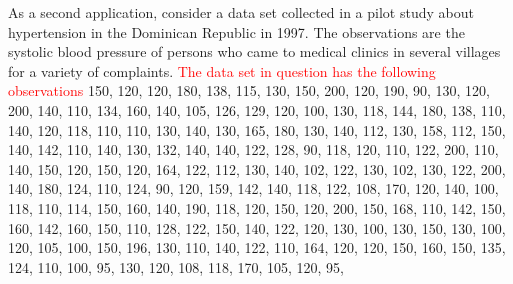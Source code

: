\documentclass[twoside,leqno,11pt]{article}
\begin{document}
As a second application, consider a data set collected in a pilot study about hypertension in the Dominican Republic
in 1997. The observations are the systolic blood pressure of persons who came to medical clinics in
several villages for a variety of complaints. 
\textcolor{red}{ The data set in question has the following observations} 
         150,
         120,
         120,
         180,
         138,
         115,
         130,
         150,
         200,
         120,
         190,
         90,
         130,
         120,
         200,
         140,
         110,
         134,
         160,
         140,
         105,
         126,
         129,
         120,
         100,
         130,
         118,
         144,
         180,
         138,
         110,
         140,
         120,
         118,
         110,
         110,
         130,
         140,
         130,
         165,
         180,
         130,
         140,
         112,
         130,
         158,
         112,
         150,
         140,
         142,
         110,
         140,
         130,
         132,
         140,
         140,
         122,
         128,
         90,
         118,
         120,
         110,
         122,
         200,
         110,
         140,
         150,
         120,
         150,
         120,
         164,
         122,
         112,
         130,
         140,
         102,
         122,
         130,
         102,
         130,
         122,
         200,
         140,
         180,
         124,
         110,
         124,
         90,
         120,
         159,
         142,
         140,
         118,
         122,
         108,
         170,
         120,
         140,
         100,
         118,
         110,
         114,
         150,
         160,
         140,
         190,
         118,
         120,
         150,
         120,
         200,
         150,
         168,
         110,
         142,
         150,
         160,
         142,
         160,
         150,
         110,
         128,
         122,
         150,
         140,
         122,
         120,
         130,
         100,
         130,
         150,
         130,
         100,
         120,
         105,
         100,
         150,
         196,
         130,
         110,
         140,
         122,
         110,
         164,
         120,
         120,
         150,
         160,
         150,
         135,
         124,
         110,
         100,
         95,
         130,
         120,
         108,
         118,
         170,
         105,
         120,
         95,
\end{document}
